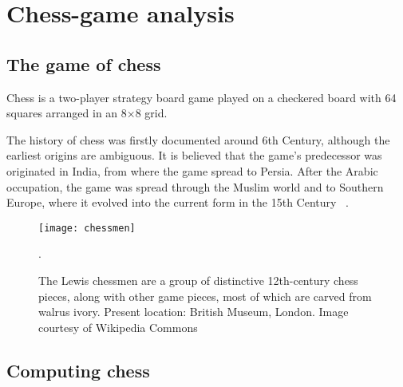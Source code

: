 \chapter{Chess-game analysis}

\section{The game of chess}

Chess is a two-player strategy board game played on a checkered board with 64 squares arranged in an 8×8 grid.

The history of chess was firstly documented around 6th Century, although the earliest origins are ambiguous. It is believed that the game's predecessor was originated in India, from where the game spread to Persia. After the Arabic occupation, the game was spread through the Muslim world and to Southern Europe, where it evolved into the current form in the 15th Century ~\cite{murray1913history}.


    \begin{figure}[H]
        \centering
        \texttt{[image: chessmen]}
        \caption{The Lewis chessmen are a group of distinctive 12th-century chess pieces, along with other game pieces, most of which are carved from walrus ivory. Present location: British Museum, London. Image courtesy of Wikipedia Commons}.
    \end{figure}

\section{Computing chess}
